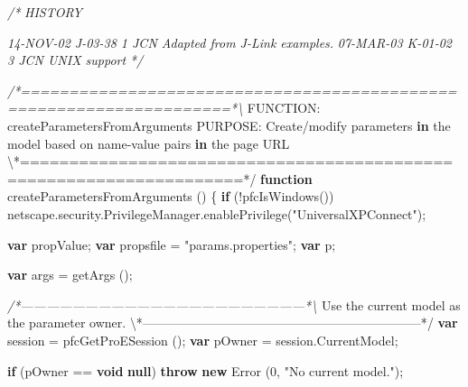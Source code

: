 \documentclass[]{article}
\newenvironment{Shaded}{}{}
\newcommand{\KeywordTok}[1]{\textcolor[rgb]{0.00,0.44,0.13}{\textbf{{#1}}}}
\newcommand{\DecValTok}[1]{\textcolor[rgb]{0.25,0.63,0.44}{{#1}}}
\newcommand{\StringTok}[1]{\textcolor[rgb]{0.25,0.44,0.63}{{#1}}}
\newcommand{\CommentTok}[1]{\textcolor[rgb]{0.38,0.63,0.69}{\textit{{#1}}}}
\newcommand{\OtherTok}[1]{\textcolor[rgb]{0.00,0.44,0.13}{{#1}}}
\newcommand{\FunctionTok}[1]{\textcolor[rgb]{0.02,0.16,0.49}{{#1}}}
\newcommand{\NormalTok}[1]{{#1}}
\begin{document}
\begin{Shaded}
\begin{Highlighting}[]
\CommentTok{/*}
\CommentTok{   HISTORY}

\CommentTok{14-NOV-02   J-03-38   $$1   JCN      Adapted from J-Link examples.}
\CommentTok{07-MAR-03   K-01-02   $$3   JCN      UNIX support}
\CommentTok{*/}

\CommentTok{/*====================================================================*\textbackslash{}}
\NormalTok{FUNCTION: createParametersFromArguments}
\NormalTok{PURPOSE:  Create/modify parameters }\KeywordTok{in} \NormalTok{the model based on name-value pairs }
            \KeywordTok{in} \NormalTok{the page URL}
\NormalTok{\textbackslash{}*====================================================================*}\OtherTok{/}
\KeywordTok{function} \FunctionTok{createParametersFromArguments} \NormalTok{()  }
\NormalTok{\{}
  \KeywordTok{if} \NormalTok{(!}\FunctionTok{pfcIsWindows}\NormalTok{())}
    \OtherTok{netscape}\NormalTok{.}\OtherTok{security}\NormalTok{.}\OtherTok{PrivilegeManager}\NormalTok{.}\FunctionTok{enablePrivilege}\NormalTok{(}\StringTok{"UniversalXPConnect"}\NormalTok{);}
  
  \KeywordTok{var} \NormalTok{propValue;}
  \KeywordTok{var} \NormalTok{propsfile = }\StringTok{"params.properties"}\NormalTok{;}
  \KeywordTok{var} \NormalTok{p;}

  \KeywordTok{var} \NormalTok{args = }\FunctionTok{getArgs} \NormalTok{();}
  
\CommentTok{/*------------------------------------------------------------------*\textbackslash{}}
  \NormalTok{Use the current model as the parameter }\OtherTok{owner}\NormalTok{.}
\NormalTok{\textbackslash{}*------------------------------------------------------------------*}\OtherTok{/}
  \KeywordTok{var} \NormalTok{session = }\FunctionTok{pfcGetProESession} \NormalTok{();}
  \KeywordTok{var} \NormalTok{pOwner = }\OtherTok{session}\NormalTok{.}\FunctionTok{CurrentModel}\NormalTok{;}
  
  \KeywordTok{if} \NormalTok{(pOwner == }\KeywordTok{void} \KeywordTok{null}\NormalTok{)}
    \KeywordTok{throw} \KeywordTok{new} \FunctionTok{Error} \NormalTok{(}\DecValTok{0}\NormalTok{, }\StringTok{"No current model."}\NormalTok{);}


\end{Highlighting}
\end{Shaded}
\end{document}
